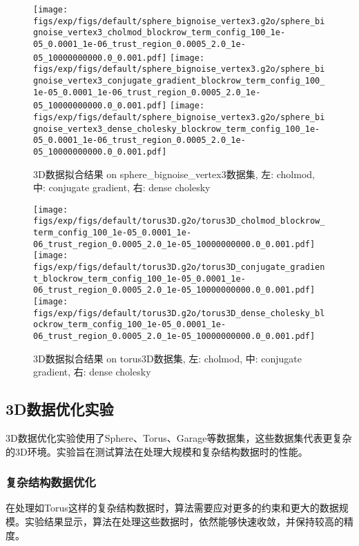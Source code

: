 \documentclass{ctexart}
\begin{document}
\begin{figure}[!htbp]
	\centering
	\texttt{[image: figs/exp/figs/default/sphere\_bignoise\_vertex3.g2o/sphere\_bignoise\_vertex3\_cholmod\_blockrow\_term\_config\_100\_1e-05\_0.0001\_1e-06\_trust\_region\_0.0005\_2.0\_1e-05\_10000000000.0\_0.001.pdf]}
	\texttt{[image: figs/exp/figs/default/sphere\_bignoise\_vertex3.g2o/sphere\_bignoise\_vertex3\_conjugate\_gradient\_blockrow\_term\_config\_100\_1e-05\_0.0001\_1e-06\_trust\_region\_0.0005\_2.0\_1e-05\_10000000000.0\_0.001.pdf]}
	\texttt{[image: figs/exp/figs/default/sphere\_bignoise\_vertex3.g2o/sphere\_bignoise\_vertex3\_dense\_cholesky\_blockrow\_term\_config\_100\_1e-05\_0.0001\_1e-06\_trust\_region\_0.0005\_2.0\_1e-05\_10000000000.0\_0.001.pdf]}
	\caption{3D数据拟合结果 on sphere\_bignoise\_vertex3数据集, 左: cholmod, 中: conjugate gradient, 右: dense cholesky}\label{exp_sphere_bignoise_vertex3}
\end{figure}


\begin{figure}[!htbp]
	\centering
	\texttt{[image: figs/exp/figs/default/torus3D.g2o/torus3D\_cholmod\_blockrow\_term\_config\_100\_1e-05\_0.0001\_1e-06\_trust\_region\_0.0005\_2.0\_1e-05\_10000000000.0\_0.001.pdf]}
	\texttt{[image: figs/exp/figs/default/torus3D.g2o/torus3D\_conjugate\_gradient\_blockrow\_term\_config\_100\_1e-05\_0.0001\_1e-06\_trust\_region\_0.0005\_2.0\_1e-05\_10000000000.0\_0.001.pdf]}
	\texttt{[image: figs/exp/figs/default/torus3D.g2o/torus3D\_dense\_cholesky\_blockrow\_term\_config\_100\_1e-05\_0.0001\_1e-06\_trust\_region\_0.0005\_2.0\_1e-05\_10000000000.0\_0.001.pdf]}
	\caption{3D数据拟合结果 on torus3D数据集, 左: cholmod, 中: conjugate gradient, 右: dense cholesky}\label{exp_torus3d}
\end{figure}

\subsection{3D数据优化实验}

3D数据优化实验使用了Sphere、Torus、Garage等数据集，这些数据集代表更复杂的3D环境。实验旨在测试算法在处理大规模和复杂结构数据时的性能。

\subsubsection{复杂结构数据优化}

在处理如Torus这样的复杂结构数据时，算法需要应对更多的约束和更大的数据规模。实验结果显示，算法在处理这些数据时，依然能够快速收敛，并保持较高的精度。
\end{document}
